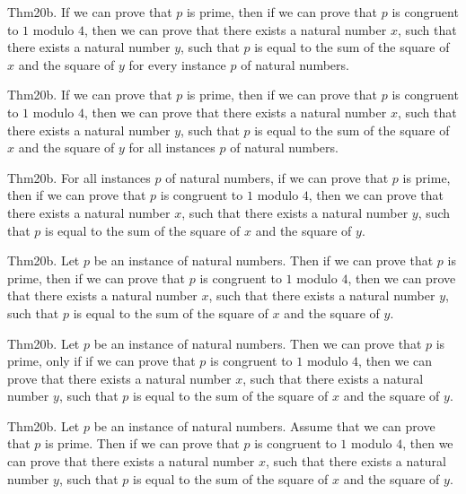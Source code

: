\documentclass{article}
\begin{document}
Thm20b. If we can prove that $p$ is prime, then if we can prove that $p$ is congruent to $1$ modulo $4$, then we can prove that there exists a natural number $x$, such that there exists a natural number $y$, such that $p$ is equal to the sum of the square of $x$ and the square of $y$ for every instance $p$ of natural numbers.

Thm20b. If we can prove that $p$ is prime, then if we can prove that $p$ is congruent to $1$ modulo $4$, then we can prove that there exists a natural number $x$, such that there exists a natural number $y$, such that $p$ is equal to the sum of the square of $x$ and the square of $y$ for all instances $p$ of natural numbers.

Thm20b. For all instances $p$ of natural numbers, if we can prove that $p$ is prime, then if we can prove that $p$ is congruent to $1$ modulo $4$, then we can prove that there exists a natural number $x$, such that there exists a natural number $y$, such that $p$ is equal to the sum of the square of $x$ and the square of $y$.

Thm20b. Let $p$ be an instance of natural numbers. Then if we can prove that $p$ is prime, then if we can prove that $p$ is congruent to $1$ modulo $4$, then we can prove that there exists a natural number $x$, such that there exists a natural number $y$, such that $p$ is equal to the sum of the square of $x$ and the square of $y$.

Thm20b. Let $p$ be an instance of natural numbers. Then we can prove that $p$ is prime, only if if we can prove that $p$ is congruent to $1$ modulo $4$, then we can prove that there exists a natural number $x$, such that there exists a natural number $y$, such that $p$ is equal to the sum of the square of $x$ and the square of $y$.

Thm20b. Let $p$ be an instance of natural numbers. Assume that we can prove that $p$ is prime. Then if we can prove that $p$ is congruent to $1$ modulo $4$, then we can prove that there exists a natural number $x$, such that there exists a natural number $y$, such that $p$ is equal to the sum of the square of $x$ and the square of $y$.
\end{document}
